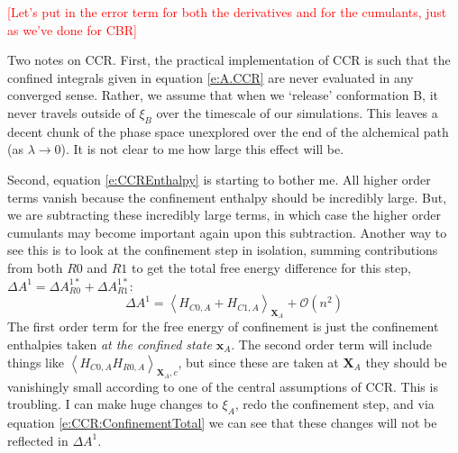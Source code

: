 \documentclass[%
 preprint,
 amsmath,amssymb,
 aps,
]{revtex4-1}
\newcommand{\warning}[1]{{\textsf{{\textcolor{red}{{[#1]}{}}}}}}
\renewcommand{\vec}[1]{{\bm{#1}}}
\begin{document}
 \warning{Let's put in the error term for both the derivatives and for the cumulants, just as we've done for CBR}
 
Two notes on CCR.  First, the practical implementation of CCR is such that the confined integrals given in equation \ref{e:A.CCR} are never evaluated in any converged sense.  Rather, we assume that when we `release' conformation B, it never travels outside of $\xi_B$ over the timescale of our simulations.  This leaves a decent chunk of the phase space unexplored over the end of the alchemical path (as $\lambda \rightarrow 0$).  It is not clear to me how large this effect will be. 
 
 Second, equation \ref{e:CCREnthalpy} is starting to bother me.  All higher order terms vanish because the confinement enthalpy should be incredibly large.  But, we are subtracting these incredibly large terms, in which case the higher order cumulants may become important again upon this subtraction.  
 Another way to see this is to look at the confinement step in isolation, summing contributions from both $R0$ and $R1$ to get the total free energy difference for this step, $\Delta A^1 = \Delta A^{1*}_ {R0}+\Delta A^{1*}_ {R1}$:
 \begin{equation}
 \Delta A^1 =  \left \langle H_{C0,A}+H_{C1,A} \right \rangle_{\vec{X}_A} + \mathcal{O} (n^2)
 \label{e:CCR:ConfinementTotal}
 \end{equation}
 The first order term for the free energy of confinement is just the confinement enthalpies taken \emph{at the confined state} $\vec{x}_A$.  The second order term will include things like $\left \langle H_{C0,A} H_{R0,A} \right \rangle_{\vec{X}_A,c}$, but since these are taken at $\vec{X}_A$ they should be vanishingly small according to one of the central assumptions of CCR.  This is troubling.  I can make huge changes to $\xi_A$, redo the confinement step, and via equation \ref{e:CCR:ConfinementTotal} we can see that these changes will not be reflected in $ \Delta A^1$.  
 
\end{document}
